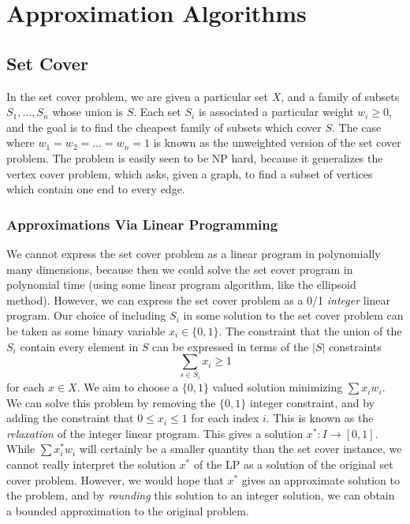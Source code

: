 \part{Approximation Algorithms}

\chapter{Set Cover}

In the set cover problem, we are given a particular set $X$, and a family of subsets $S_1, \dots, S_n$ whose union is $S$. Each set $S_i$ is associated a particular weight $w_i \geq 0$, and the goal is to find the cheapest family of subsets which cover $S$. The case where $w_1 = w_2 = \dots = w_n = 1$ is known as the unweighted version of the set cover problem. The problem is easily seen to be NP hard, because it generalizes the vertex cover problem, which asks, given a graph, to find a subset of vertices which contain one end to every edge.

\section{Approximations Via Linear Programming}

We cannot express the set cover problem as a linear program in polynomially many dimensions, because then we could solve the set cover program in polynomial time (using some linear program algorithm, like the ellipsoid method). However, we can express the set cover problem as a 0/1 {\it integer} linear program. Our choice of including $S_i$ in some solution to the set cover problem can be taken as some binary variable $x_i \in \{ 0, 1 \}$. The constraint that the union of the $S_i$ contain every element in $S$ can be expressed in terms of the $|S|$ constraints
%
\[ \sum_{s \in S_i} x_i \geq 1 \]
%
for each $x \in X$. We aim to choose a $\{ 0, 1 \}$ valued solution minimizing $\sum x_i w_i$. We can solve this problem by removing the $\{ 0, 1 \}$ integer constraint, and by adding the constraint that $0 \leq x_i \leq 1$ for each index $i$. This is known as the {\it relaxation} of the integer linear program. This gives a solution $x^*: I \to [0,1]$. While $\sum x^*_i w_i$ will certainly be a smaller quantity than the set cover instance, we cannot really interpret the solution $x^*$ of the LP as a solution of the original set cover problem. However, we would hope that $x^*$ gives an approximate solution to the problem, and by {\it rounding} this solution to an integer solution, we can obtain a bounded approximation to the original problem.

